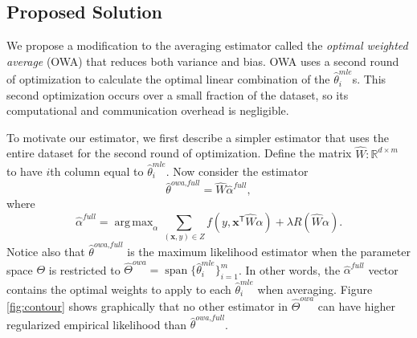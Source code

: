 \documentclass[twoside]{article}
\DeclareMathOperator*{\argmin}{arg\,min}
\DeclareMathOperator*{\argmax}{arg\,max}
\DeclareMathOperator*{\vecspan}{span}
\newcommand{\Q}{\mathcal{Q}}
\newcommand{\matW}{\hat W}
\newcommand{\W}{{\hat \Theta^{\textit{owa}}}}
\newcommand{\x}{\mathbf{x}}
\newcommand{\w}{\theta}
\newcommand{\ahat}{\hat\alpha}
\newcommand{\afull}{\ahat^{\textit{full}}}
\newcommand{\wowafull}{\hat\w^{\textit{owa,full}}}
\newcommand{\wmle}{\hat\w^{mle}}
\newcommand{\wstar}{{\w^{*}}}
\newcommand{\wq}{\hat\w^{q}}
\newcommand{\wqstar}{\hat\w^{q^*}}
\newcommand{\trans}[1]{\ensuremath{{#1}^{\mathsf{T}}}}
\newcommand{\ltwo}[1]{{\lVert {#1} \rVert}}
\begin{document}

\subsection{Proposed Solution}

We propose a modification to the averaging estimator called the \emph{optimal weighted average} (OWA) that reduces both variance and bias.
OWA uses a second round of optimization to calculate the optimal linear combination of the $\wmle_i$s.
This second optimization occurs over a small fraction of the dataset,
so its computational and communication overhead is negligible.

To motivate our estimator,
we first describe a simpler estimator that uses the entire dataset for the second round of optimization.
Define the matrix $\matW : \mathbb{R}^{d\times m}$ to have $i$th column equal to $\wmle_i$.
Now consider the estimator
\begin{equation}
\wowafull = \matW \afull
,
\end{equation}
where
\begin{equation}
\label{eq:afull}
\afull = \argmax_\alpha \sum _{(\x,y)\in Z} f\left(y,\trans\x \matW \alpha \right)
+
\lambda R(\matW\alpha)
.
\end{equation}
Notice also that $\wowafull$ is the maximum likelihood estimator when the parameter space $\Theta$ is restricted to $\W = \vecspan \{\wmle_i\}_{i=1}^m$.
In other words, the $\afull$ vector contains the optimal weights to apply to each $\wmle_i$ when averaging.
Figure \ref{fig:contour} shows graphically that no other estimator in $\W$ can have higher regularized empirical likelihood than $\wowafull$.
\end{document}
